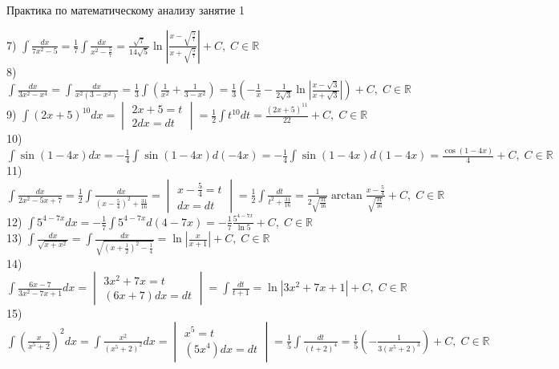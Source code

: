 \documentclass[14pt]{article}
\begin{document}
 
	\LARGE
	\begin{center}
		Практика по математическому анализу занятие 1
	\end{center}
	\normalsize
	7) $\int \frac{dx}{7x^2-5} = \frac{1}{7} \int \frac{dx}{x^2-\frac{5}{7}} = \frac{\sqrt{7}}{14\sqrt{5}} \ln |\frac{x-\sqrt{\frac{5}{7}}}{x+\sqrt{\frac{5}{7}}}| +C, \; C \in \mathbb{R}$ \\
	8) $\int \frac{dx}{3x^2-x^4} = \int \frac{dx}{x^2(3-x^2)} = \frac{1}{3}\int (\frac{1}{x^2}+\frac{1}{3-x^2}) = \frac{1}{3}(-\frac{1}{x}-\frac{1}{2\sqrt{3}}\ln |\frac{x-\sqrt{3}}{x+\sqrt{3}}|)+C, \; C \in \mathbb{R}$ \\
	9) $\int (2x+5)^{10}dx = 
	\begin{vmatrix}
		2x+5 = t \\
		2dx = dt	
	\end{vmatrix} = \frac{1}{2}\int t^{10} dt = \frac{(2x+5)^{11}}{22} + C, \; C \in \mathbb{R}$  \\
	10) $\int \sin (1-4x) dx = -\frac{1}{4} \int \sin (1-4x) d(-4x) = -\frac{1}{4} \int \sin (1-4x) d(1-4x) = \frac{\cos(1-4x)}{4} + C, \; C \in \mathbb{R}$ \\
	11) $\int \frac{dx}{2x^2-5x+7} = \frac{1}{2} \int \frac{dx}{(x-\frac{5}{4})^2 + \frac{31}{16}} = \begin{vmatrix} x-\frac{5}{4} = t \\ dx = dt  \end{vmatrix} = \frac{1}{2} \int \frac{dt}{t^2 + \frac{31}{16}} = \frac{1}{2\sqrt{\frac{31}{16}}} \arctan{\frac{x-\frac{5}{4}}{\sqrt{\frac{31}{16}}}}+C, \; C \in \mathbb{R}$ \\
	12) $\int 5^{4-7x} dx = -\frac{1}{7}\int 5^{4-7x} d(4-7x) = -\frac{1}{7} \frac{5^{4-7x}}{\ln5} + C, \; C \in \mathbb{R}$ \\
	13) $\int \frac{dx}{\sqrt{x+x^2}}=\int \frac{dx}{\sqrt{(x+\frac{1}{2})^2 - \frac{1}{4}}} = \ln|\frac{x}{x+1}|+C, \; C \in \mathbb{R}$ \\
	14) $\int \frac{6x-7}{3x^2-7x+1}dx=\begin{vmatrix}3x^2+7x=t \\ (6x+7)dx=dt \end{vmatrix} = \int \frac{dt}{t+1}=\ln|3x^2+7x+1| +C, \; C \in \mathbb{R}$ \\
	15) $\int \left( \frac{x}{x^5+2} \right)^2 dx = \int \frac{x^2}{(x^5+2)^2}dx = \begin{vmatrix} x^5 = t \\ (5x^4) dx = dt \end{vmatrix} = \frac{1}{5}\int \frac{dt}{(t+2)^4} = \frac{1}{5}(-\frac{1}{3(x^5+2)^3})+C, \; C \in \mathbb{R}$ \\
\end{document}
